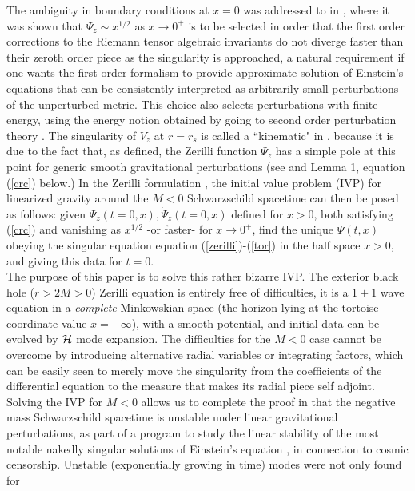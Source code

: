 \documentclass[aps,floats,showpacs,amssymb,tightenlines]{revtex4}
\begin{document}
The ambiguity in boundary conditions at $x=0$ was addressed to in \cite{ghi,dg}, where it was shown 
 that   $\Psi_z \sim x^{1/2} $   as $x \to 0^+$ is to be selected in order  that the first
 order corrections to the Riemann tensor algebraic invariants do not diverge faster than
their zeroth order piece as the singularity is approached, 
a  natural requirement if one wants the first order
formalism to provide approximate solution of Einstein's equations that can be consistently interpreted as
 arbitrarily small perturbations of the unperturbed metric. This choice also 
selects perturbations with finite energy, using the energy notion obtained by going to
second order perturbation theory \cite{ghi,dg}.   The singularity of $V_z$ at 
$r=r_s$ is called a ``kinematic"  in \cite{dg}, because it is due 
to the fact that, as 
defined, the Zerilli function $\Psi_z$ has a simple pole
at this point for generic smooth gravitational perturbations 
(see \cite{dg} and  Lemma 1, equation (\ref{crc}) below.) In the Zerilli 
formulation \cite{zerilli, ki}, the initial value problem (IVP) for linearized gravity around the $M<0$ Schwarzschild
spacetime can then be posed as follows: 
given $\Psi_z(t=0,x), \dot \Psi_z(t=0,x)$ defined for $x>0$, 
both satisfying (\ref{crc}) 
and vanishing as $x^{1/2}$ -or faster- for $x \to 0^+$, find the unique $\Psi(t,x)$ obeying the 
singular equation equation (\ref{zerilli})-(\ref{tor}) in the half space $x>0$, and giving this 
data for $t=0$. \\
The purpose of this paper is to solve this rather bizarre IVP.
The exterior black hole
 ($r>2M>0$) Zerilli equation is entirely free of difficulties, 
it is a  $1+1$ wave equation in a {\em complete} Minkowskian space (the horizon 
lying at the tortoise coordinate value $x=-\infty$), with a smooth  potential, and 
initial data can be evolved by ${\cal H}$ mode  expansion. 
The difficulties for the $M<0$ case cannot be overcome 
 by introducing alternative radial variables or integrating factors, which
can be easily seen to merely move the singularity from the coefficients of the differential equation to the measure
that makes its radial piece self adjoint.  
Solving the IVP for $M<0$ allows us to complete the proof in \cite{dg} that
the negative mass Schwarzschild spacetime is unstable under linear gravitational perturbations, as part of a program 
to study  the linear stability 
of the most notable nakedly singular solutions of Einstein's equation \cite{dgp,dgsv},  
in connection to  cosmic censorship. Unstable (exponentially growing in time)  modes were not only found for 
\end{document}
